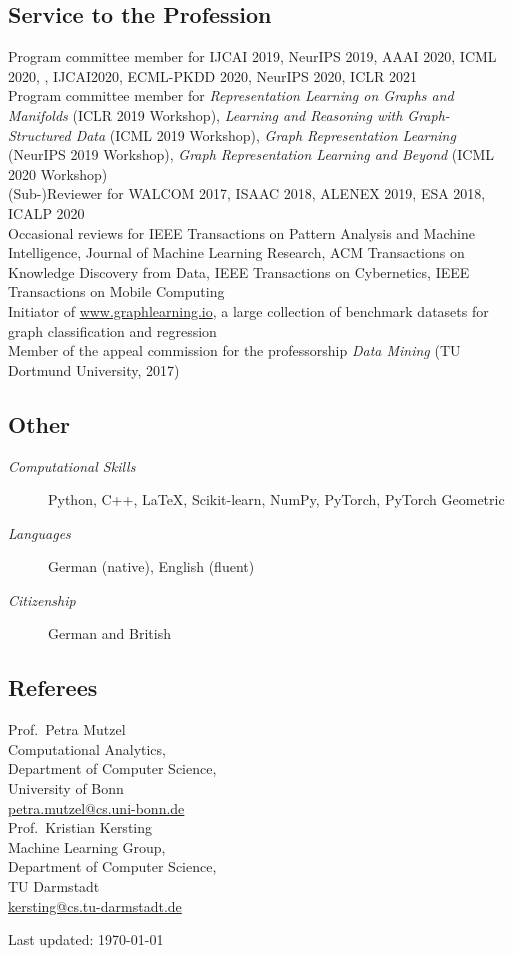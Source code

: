 \documentclass[11pt, a4paper]{scrartcl}
\begin{document}
\subsection*{Service to the Profession}
Program committee member for IJCAI 2019, NeurIPS  2019, AAAI 2020, ICML 2020, , IJCAI2020, ECML-PKDD 2020,  NeurIPS 2020, ICLR 2021\\

Program committee member for \emph{Representation Learning on Graphs and Manifolds} (ICLR 2019 Workshop), \emph{Learning and Reasoning with Graph-Structured Data} (ICML 2019 Workshop), \emph{Graph Representation Learning} (NeurIPS 2019 Workshop), \emph{Graph Representation Learning and Beyond} (ICML 2020 Workshop)\\

(Sub-)Reviewer for WALCOM 2017, ISAAC 2018, ALENEX 2019, ESA 2018, ICALP 2020 \\

Occasional reviews for IEEE Transactions on Pattern Analysis and Machine Intelligence, Journal of Machine Learning Research, ACM Transactions on Knowledge Discovery from Data, IEEE Transactions on Cybernetics, IEEE Transactions on Mobile Computing\\

Initiator of \url{www.graphlearning.io}, a large collection of benchmark datasets for graph classification and regression\\

Member of the appeal commission for the professorship \emph{Data Mining} (TU Dortmund University, 2017)

\subsection*{Other}
\begin{description}
	\item[\em Computational Skills] Python, C\hspace{-2pt}+\hspace{-3pt}+, \LaTeX, Scikit-learn, NumPy, PyTorch, PyTorch Geometric
	\item[\em Languages] German (native), English (fluent)
	\item[\em Citizenship] German and British
\end{description}

\subsection*{Referees}
Prof.~Petra Mutzel\\
Computational Analytics,\\ 
Department of Computer Science,\\
University of Bonn \\
\href{mailto:petra.mutzel@cs.uni-bonn.de}{petra.mutzel@cs.uni-bonn.de}\\


Prof.~Kristian Kersting\\ 
Machine Learning Group,\\
Department of Computer Science,\\
TU Darmstadt\\
\href{mailto:kersting@cs.tu-darmstadt.de}{kersting@cs.tu-darmstadt.de}\\

\vfill{} 
\begin{center}
{\scriptsize Last updated: \today}
\end{center}
\end{document}
